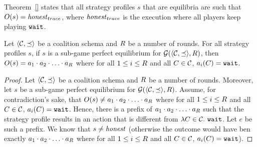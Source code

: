 Theorem~\ref{} states that all strategy profiles $s$ that are equilibria are such that $O(s) = \mathit{honest}_{trace}$, where $\mathit{honest}_{trace}$ is the execution where all players keep playing $\mathtt{wait}$.

\begin{theorem}
Let $\langle \mathcal{C}, \preceq \rangle$ be a coalition schema and $R$ be a number of rounds.
%
For all strategy profiles $s$, 
%
if $s$ is a sub-game perfect equilibrium for $\mathcal{G}(\langle \mathcal{C}, \preceq \rangle, R)$, then
%
$O(s) = a_1 \cdot a_2 \cdot \ldots \cdot a_{R}$ where for all $1 \leq i \leq R$ and all $C \in \mathcal{C}$, $a_i(C) = \mathtt{wait}$.
\end{theorem}

\begin{proof}
Let $\langle \mathcal{C}, \preceq \rangle$ be a coalition schema and $R$ be a number of rounds.
%
Moreover, let $s$ be a sub-game perfect equilibrium for $\mathcal{G}(\langle \mathcal{C}, \preceq \rangle, R)$.
%
Assume, for contradiction's sake, that $O(s) \neq a_1 \cdot a_2 \cdot \ldots \cdot a_{R}$ where for all $1 \leq i \leq R$ and all $C \in \mathcal{C}$, $a_i(C) = \mathtt{wait}$.
%
Hence, there is a prefix of $a_1 \cdot a_2 \cdot \ldots \cdot a_{R}$ such that the strategy profile results in an action that is different from $\lambda C \in \mathcal{C}.\ \mathtt{wait}$.
%
Let $e$ be such a prefix.
%
We know that $s \neq \mathit{honest}$ (otherwise the outcome would have ben exactly $a_1 \cdot a_2 \cdot \ldots \cdot a_{R}$ where for all $1 \leq i \leq R$ and all $C \in \mathcal{C}$, $a_i(C) = \mathtt{wait}$).
%

\end{proof}






